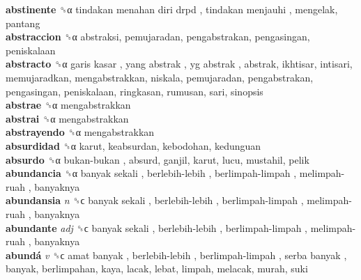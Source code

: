 \textbf{abstinente} ␝α   tindakan menahan diri drpd ,  tindakan menjauhi , mengelak, pantang  \\
\textbf{abstraccion} ␝α  abstraksi, pemujaradan, pengabstrakan, pengasingan, peniskalaan  \\
\textbf{abstracto} ␝α   garis kasar ,  yang abstrak ,  yg abstrak , abstrak, ikhtisar, intisari, memujaradkan, mengabstrakkan, niskala, pemujaradan, pengabstrakan, pengasingan, peniskalaan, ringkasan, rumusan, sari, sinopsis  \\
\textbf{abstrae} ␝α  mengabstrakkan  \\
\textbf{abstrai} ␝α  mengabstrakkan  \\
\textbf{abstrayendo} ␝α  mengabstrakkan  \\
\textbf{absurdidad} ␝α  karut, keabsurdan, kebodohan, kedunguan  \\
\textbf{absurdo} ␝α   bukan-bukan , absurd, ganjil, karut, lucu, mustahil, pelik  \\
\textbf{abundancia} ␝α   banyak sekali ,  berlebih-lebih ,  berlimpah-limpah ,  melimpah-ruah , banyaknya  \\
\textbf{abundansia} \emph{n}  ␝ϲ   banyak sekali ,  berlebih-lebih ,  berlimpah-limpah ,  melimpah-ruah , banyaknya  \\
\textbf{abundante} \emph{adj}  ␝ϲ   banyak sekali ,  berlebih-lebih ,  berlimpah-limpah ,  melimpah-ruah , banyaknya  \\
\textbf{abundá} \emph{v}  ␝ϲ   amat banyak ,  berlebih-lebih ,  berlimpah-limpah ,  serba banyak , banyak, berlimpahan, kaya, lacak, lebat, limpah, melacak, murah, suki  \\
